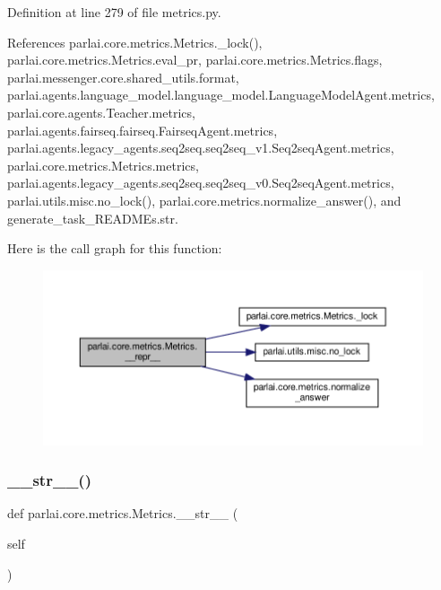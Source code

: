 Definition at line 279 of file metrics.\+py.



References parlai.\+core.\+metrics.\+Metrics.\+\_\+lock(), parlai.\+core.\+metrics.\+Metrics.\+eval\+\_\+pr, parlai.\+core.\+metrics.\+Metrics.\+flags, parlai.\+messenger.\+core.\+shared\+\_\+utils.\+format, parlai.\+agents.\+language\+\_\+model.\+language\+\_\+model.\+Language\+Model\+Agent.\+metrics, parlai.\+core.\+agents.\+Teacher.\+metrics, parlai.\+agents.\+fairseq.\+fairseq.\+Fairseq\+Agent.\+metrics, parlai.\+agents.\+legacy\+\_\+agents.\+seq2seq.\+seq2seq\+\_\+v1.\+Seq2seq\+Agent.\+metrics, parlai.\+core.\+metrics.\+Metrics.\+metrics, parlai.\+agents.\+legacy\+\_\+agents.\+seq2seq.\+seq2seq\+\_\+v0.\+Seq2seq\+Agent.\+metrics, parlai.\+utils.\+misc.\+no\+\_\+lock(), parlai.\+core.\+metrics.\+normalize\+\_\+answer(), and generate\+\_\+task\+\_\+\+R\+E\+A\+D\+M\+Es.\+str.

Here is the call graph for this function\+:
\nopagebreak
\begin{figure}[H]
\begin{center}
\leavevmode
\includegraphics[width=350pt]{classparlai_1_1core_1_1metrics_1_1Metrics_a652e6f48f5754c1365f18a7f2c86353b_cgraph}
\end{center}
\end{figure}
\mbox{\label{classparlai_1_1core_1_1metrics_1_1Metrics_a3d15255e3daf76e9aeabd23c94f879cf}} 
\subsubsection{\texorpdfstring{\+\_\+\+\_\+str\+\_\+\+\_\+()}{\_\_str\_\_()}}
{\footnotesize\ttfamily def parlai.\+core.\+metrics.\+Metrics.\+\_\+\+\_\+str\+\_\+\+\_\+ (\begin{DoxyParamCaption}\item[{}]{self }\end{DoxyParamCaption})}



